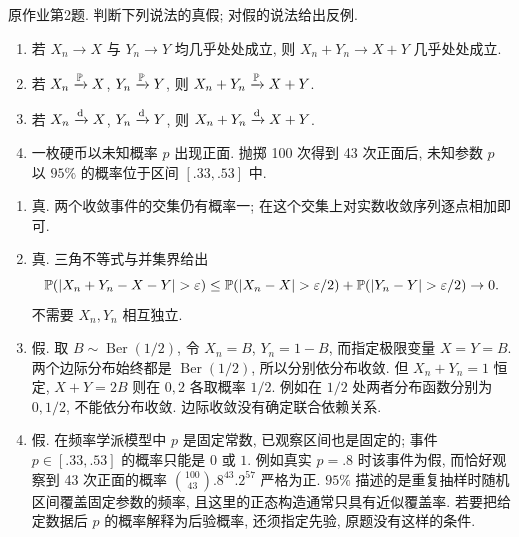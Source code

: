 \begin{exercise}\label{ps01:p02}
原作业第2题. 判断下列说法的真假; 对假的说法给出反例.
\begin{enumerate}[label=\arabic*.]
\item 若 $X_n\to X$ 与 $Y_n\to Y$ 均几乎处处成立, 则 $X_n+Y_n\to X+Y$ 几乎处处成立.
\item 若 $X_n\xrightarrow{\mathbb P} X$, $Y_n\xrightarrow{\mathbb P} Y$, 则 $X_n+Y_n\xrightarrow{\mathbb P} X+Y$.
\item 若 $X_n\xrightarrow{\mathrm d} X$, $Y_n\xrightarrow{\mathrm d} Y$, 则 $X_n+Y_n\xrightarrow{\mathrm d} X+Y$.
\item 一枚硬币以未知概率 $p$ 出现正面. 抛掷 100 次得到 43 次正面后, 未知参数 $p$ 以 $95\%$ 的概率位于区间 $[.33,.53]$ 中.
\end{enumerate}
\end{exercise}
\begin{solution}
\begin{enumerate}[label=\arabic*.]
\item 真. 两个收敛事件的交集仍有概率一; 在这个交集上对实数收敛序列逐点相加即可.
\item 真. 三角不等式与并集界给出
\[
\PP(|X_n+Y_n-X-Y|>\varepsilon)
\le\PP(|X_n-X|>\varepsilon/2)+\PP(|Y_n-Y|>\varepsilon/2)\to0.
\]
不需要 $X_n,Y_n$ 相互独立.
\item 假. 取 $B\sim\operatorname{Ber}(1/2)$, 令 $X_n=B$, $Y_n=1-B$, 而指定极限变量 $X=Y=B$. 两个边际分布始终都是 $\operatorname{Ber}(1/2)$, 所以分别依分布收敛. 但 $X_n+Y_n=1$ 恒定, $X+Y=2B$ 则在 $0,2$ 各取概率 $1/2$. 例如在 $1/2$ 处两者分布函数分别为 $0,1/2$, 不能依分布收敛. 边际收敛没有确定联合依赖关系.
\item 假. 在频率学派模型中 $p$ 是固定常数, 已观察区间也是固定的; 事件 $p\in[.33,.53]$ 的概率只能是 $0$ 或 $1$. 例如真实 $p=.8$ 时该事件为假, 而恰好观察到 43 次正面的概率 $\binom{100}{43}.8^{43}.2^{57}$ 严格为正. $95\%$ 描述的是重复抽样时随机区间覆盖固定参数的频率, 且这里的正态构造通常只具有近似覆盖率. 若要把给定数据后 $p$ 的概率解释为后验概率, 还须指定先验, 原题没有这样的条件.
\end{enumerate}
\end{solution}

